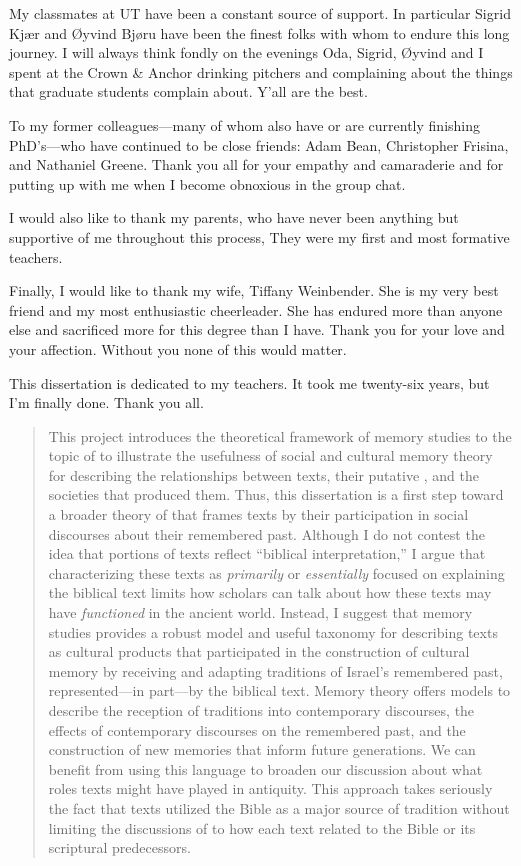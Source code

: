 My classmates at UT have been a constant source of support. In particular Sigrid Kjær and Øyvind Bjøru have been the finest folks with whom to endure this long journey. I will always think fondly on the evenings Oda, Sigrid, Øyvind and I spent at the Crown \& Anchor drinking pitchers and complaining about the things that graduate students complain about. Y'all are the best.

To my former colleagues---many of whom also have or are currently finishing PhD's---who have continued to be close friends: Adam Bean, Christopher Frisina, and Nathaniel Greene. Thank you all for your empathy and camaraderie and for putting up with me when I become obnoxious in the group chat.

I would also like to thank my parents, who have never been anything but supportive of me throughout this process, They were my first and most formative teachers.

Finally, I would like to thank my wife, Tiffany Weinbender. She is my very best friend and my most enthusiastic cheerleader. She has endured more than anyone else and sacrificed more for this degree than I have. Thank you for your love and your affection. Without you none of this would matter.

This dissertation is dedicated to my teachers. It took me twenty-six years, but I'm finally done. Thank you all.


\begin{abstract}
  This project introduces the theoretical framework of memory studies to the topic of \rwb to illustrate the usefulness of social and cultural memory theory for describing the relationships between \rwb texts, their putative \vorlagen, and the societies that produced them. Thus, this dissertation is a first step toward a broader theory of \rwb that frames \rwb texts by their participation in social discourses about their remembered past. Although I do not contest the idea that portions of \rwb texts reflect ``biblical interpretation,'' I argue that characterizing these texts as \emph{primarily} or \emph{essentially} focused on explaining the biblical text limits how scholars can talk about how these texts may have \emph{functioned} in the ancient world. Instead, I suggest that memory studies provides a robust model and useful taxonomy for describing \rwb texts as cultural products that participated in the construction of cultural memory by receiving and adapting traditions of Israel's remembered past, represented---in part---by the biblical text. Memory theory offers models to describe the reception of traditions into contemporary discourses, the effects of contemporary discourses on the remembered past, and the construction of new memories that inform future generations. We can benefit from using this language to broaden our discussion about what roles \rwb texts might have played in antiquity. This approach takes seriously the fact that \rwb texts utilized the Bible as a major source of tradition without limiting the discussions of \rwb to how each text related to the Bible or its scriptural predecessors.
\end{abstract}


\tableofcontents*
\begin{SingleSpace}
\end{SingleSpace}